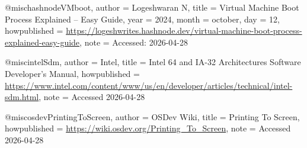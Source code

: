@misc{hashnodeVMboot,
  author       = {{Logeshwaran N}},
  title        = {{Virtual Machine Boot Process Explained – Easy Guide}},
  year         = {2024},
  month        = {october},
  day          = {12},
  howpublished = {\url{https://logeshwrites.hashnode.dev/virtual-machine-boot-process-explained-easy-guide}},
  note         = {Accessed: 2026-04-28}
}

@misc{intelSdm,
  author       = {{Intel}},
  title        = {{Intel 64 and IA-32 Architectures Software Developer's Manual}},
  howpublished = {\url{https://www.intel.com/content/www/us/en/developer/articles/technical/intel-sdm.html}},
  note         = {Accessed 2026-04-28}
}

@misc{osdevPrintingToScreen,
  author       = {{OSDev Wiki}},
  title        = {{Printing To Screen}},
  howpublished = {\url{https://wiki.osdev.org/Printing_To_Screen}},
  note         = {Accessed 2026-04-28}
}